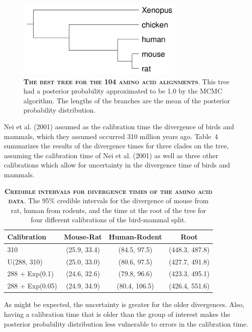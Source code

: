 \documentclass{svmult}
\begin{document}
\begin{figure}[b]
\centering
\includegraphics[height=1.5in]{fig12}
\caption{\textbf{\textsc{The best tree for the 104 amino acid alignments}}.
This tree had a posterior probability approximated to be 1.0 by the MCMC algorithm. The lengths of the branches are the mean of the posterior
probability distribution.}
\label{fig12}
\end{figure}
Nei et al. (2001) assumed as the calibration time the divergence of birds and mammals, which they assumed occurred 310 million years ago. Table~4 summarizes the results
of the divergence times for three clades on the tree, assuming the calibration time of Nei et al. (2001) as well as three other calibrations which allow for uncertainty in the
divergence time of birds and mammals.
\begin{table}[t]
\centering
\caption{\textbf{\textsc{Credible intervals for divergence times of the amino acid data}}.
The 95\% credible intervals for the divergence of mouse from rat, human from rodents, and the time at
the root of the tree for four different calibrations of the bird-mammal split.}
\begin{tabular}{l c c c} \hline
Calibration & Mouse-Rat & Human-Rodent & Root \\ \hline
310 & (25.9, 33.4) & (84.5, 97.5) & (448.3, 487.8) \\
U(288, 310) & (25.0, 33.0) & (80.6, 97.5) & (427.7, 491.8) \\
288 + Exp(0.1) & (24.6, 32.6) & (79.8, 96.6) & (423.3, 495.1) \\
288 + Exp(0.05) & (24.9, 34.9) & (80.4, 106.5) & (426.4, 551.6) \\ 

\hline
\end{tabular}
\label{tab4}
\end{table}
As might be expected, the uncertainty is greater for the older divergences. Also, having a calibration time that is older than the group
of interest makes the posterior probability distribution less vulnerable to errors in the calibration time.
\end{document}
